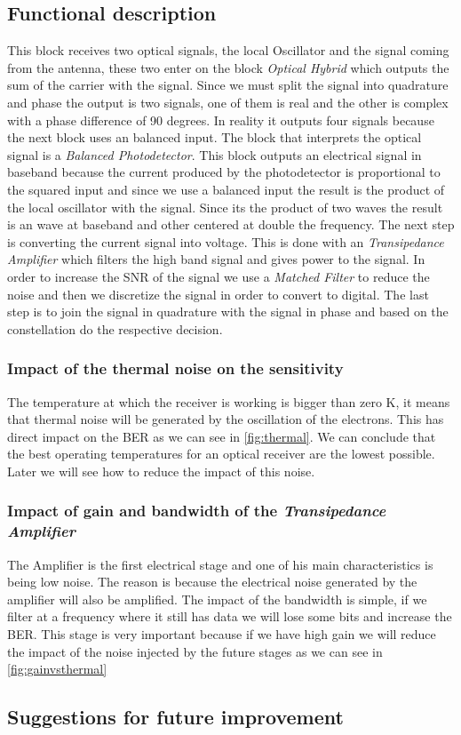 \subsection*{Functional description}
This block receives two optical signals, the local Oscillator and the signal coming from the antenna, these two enter on the block \textit{Optical Hybrid} which outputs the sum of the carrier with the signal. Since we must split the signal into quadrature and phase the output is two signals, one of them is real and the other is complex with a phase difference of 90 degrees. In reality it outputs four signals because the next block uses an balanced input.\newline
The block that interprets the optical signal is a \textit{Balanced Photodetector}. This block outputs an electrical signal in baseband because the current produced by the photodetector is proportional to the squared input and since we use a balanced input the result is the product of the local oscillator with the signal. Since its the product of two waves the result is an wave at baseband and other centered at double the frequency. \newline
The next step is converting the current signal into voltage. This is done with an \textit{Transipedance Amplifier} which filters the high band signal and gives power to the signal.\newline
In order to increase the SNR of the signal we use a \textit{Matched Filter} to reduce the noise and then we discretize the signal in order to convert to digital.\newline
The last step is to join the signal in quadrature with the signal in phase and based on the constellation do the respective decision.
\subsubsection{Impact of the thermal noise on the sensitivity}
The temperature at which the receiver is working is bigger than zero K, it means that thermal noise will be generated by the oscillation of the electrons. This has direct impact on the BER as we can see in \ref{fig:thermal}.\newline
We can conclude that the best operating temperatures for an optical receiver are the lowest possible. Later we will see how to reduce the impact of this noise.

\subsubsection{Impact of gain and bandwidth of the \textit{Transipedance Amplifier}}
The Amplifier is the first electrical stage and one of his main characteristics is being low noise. The reason is because the electrical noise generated by the amplifier will also be amplified.\newline
The impact of the bandwidth is simple, if we filter at a frequency where it still has data we will lose some bits and increase the BER.
This stage is very important because if we have high gain we will reduce the impact of the noise injected by the future stages as we can see in \ref{fig:gainvsthermal}
\subsection*{Suggestions for future improvement}

